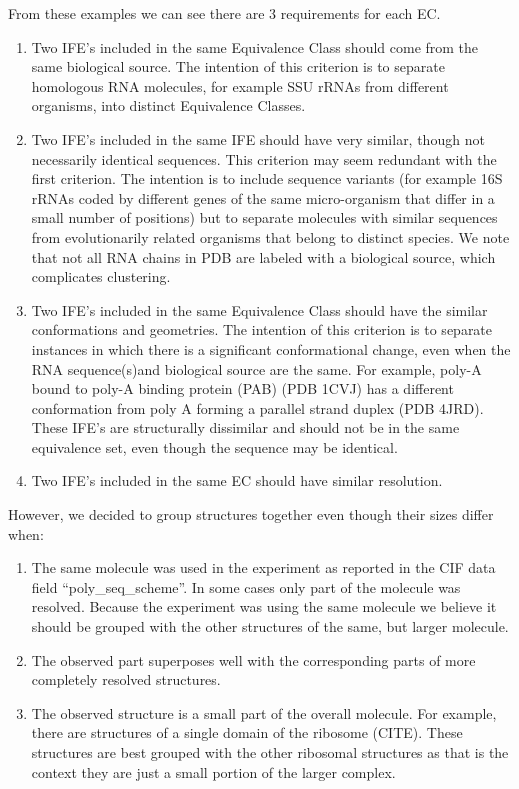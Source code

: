 From these examples we can see there are 3 requirements for each EC.
\begin{enumerate}
  \item Two IFE’s included in the same Equivalence Class should come from the
    same biological source. The intention of this criterion is to separate
    homologous RNA molecules, for example SSU rRNAs from different organisms,
    into distinct Equivalence Classes. 

  \item Two IFE’s included in the same IFE should have very similar, though not
    necessarily identical sequences. This criterion may seem redundant with the
    first criterion. The intention is to include sequence variants (for example
    16S rRNAs coded by different genes of the same micro-organism that differ in
    a small number of positions) but to separate molecules with similar
    sequences from evolutionarily related organisms that belong to distinct
    species. We note that not all RNA chains in PDB are labeled with a
    biological source, which complicates clustering.

  \item Two IFE’s included in the same Equivalence Class should have the similar
    conformations and geometries. The intention of this criterion is to separate
    instances in which there is a significant conformational change, even when
    the RNA sequence(s)and biological source  are the same. For example, poly-A
    bound to poly-A binding protein (PAB) (PDB 1CVJ) has a different
    conformation from poly A forming a parallel strand duplex (PDB 4JRD). These
    IFE’s are structurally dissimilar and should not be in the same equivalence
    set, even though the sequence may be identical.

  \item Two IFE’s included in the same EC should have similar resolution. 
\end{enumerate}

However, we decided to group structures together even though their sizes differ
when:

\begin{enumerate}
  \item The same molecule was used in the experiment as reported in the CIF data
    field ``poly\_seq\_scheme''. In some cases only part of the molecule was
    resolved. Because the experiment was using the same molecule we believe it
    should be grouped with the other structures of the same, but larger
    molecule.

  \item The observed part superposes well with the corresponding parts of more
    completely resolved structures.

  \item The observed structure is a small part of the overall molecule. For
    example, there are structures of a single domain of the ribosome (CITE).
    These structures are best grouped with the other ribosomal structures as
    that is the context they are just a small portion of the larger complex.
\end{enumerate}

